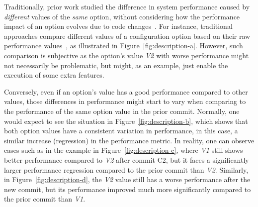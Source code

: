 
Traditionally, prior work studied the difference in system performance caused by \emph{different} values of the \emph{same} option, without considering how the performance impact of an option evolves due to code changes~\cite{tse}. For instance, traditional approaches compare different values of a configuration option based on their raw performance values~\cite{RN2880,RN3537,RN3543}, as illustrated in Figure~\ref{fig:description-a}. However, such comparison is subjective as
the option's value \emph{V2} with worse performance might not necessarily be problematic, but might, as an example, just enable the execution of some extra features.

Conversely, even if an option's value has a good performance compared to other values, those differences in performance might start to vary %
when comparing to the performance of the same option value in the prior commit. Normally, one would expect to see the situation in Figure~\ref{fig:description-b}, which shows that both option values have a consistent variation in performance, in this case, a similar increase (regression) in the performance metric. In reality, one can observe %
cases such as in the example in Figure~\ref{fig:description-c}, where \emph{V1} still shows better performance compared to \emph{V2} after commit C2, but it faces a significantly larger performance regression compared to the prior commit than \emph{V2}. Similarly, in Figure~\ref{fig:description-d}, the \emph{V2} value still has a worse performance after the new commit, but its performance improved much more significantly compared to the prior commit than \emph{V1}.

